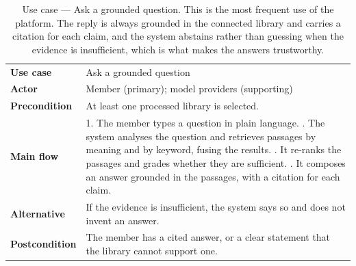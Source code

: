 \begin{table}[H]
  \centering
  \caption{Use case --- Ask a grounded question. This is the most frequent use of
  the platform. The reply is always grounded in the connected library and carries
  a citation for each claim, and the system abstains rather than guessing when the
  evidence is insufficient, which is what makes the answers trustworthy.}
  \label{tab:uc-chat}
  \small
  \begin{tabularx}{\textwidth}{@{}p{}X@{}}
    \toprule
    \textbf{Use case}      & Ask a grounded question \\
    \textbf{Actor}         & Member (primary); model providers (supporting) \\
    \textbf{Precondition}  & At least one processed library is selected. \\
    \midrule
    \textbf{Main flow}     & 1. The member types a question in plain language. \newline
                             2. The system analyses the question and retrieves passages by meaning and by keyword, fusing the results. \newline
                             3. It re-ranks the passages and grades whether they are sufficient. \newline
                             4. It composes an answer grounded in the passages, with a citation for each claim. \\
    \textbf{Alternative}   & If the evidence is insufficient, the system says so and does not invent an answer. \\
    \textbf{Postcondition} & The member has a cited answer, or a clear statement that the library cannot support one. \\
    \bottomrule
  \end{tabularx}
\end{table}

